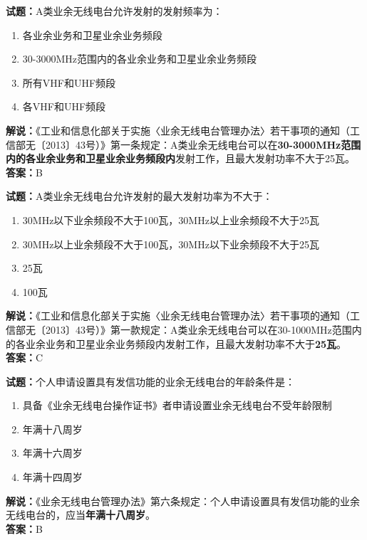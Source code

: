 \documentclass{ctexbook}
\begin{document}
\bigskip


\noindent\textbf{试题：}A类业余无线电台允许发射的发射频率为：
\begin{enumerate}[leftmargin=3em]
	\item 各业余业务和卫星业余业务频段
	\item 30-3000\si{\MHz}范围内的各业余业务和卫星业余业务频段
	\item 所有VHF和UHF频段
	\item 各VHF和UHF频段
\end{enumerate}
\noindent\textbf{解说：}《工业和信息化部关于实施〈业余无线电台管理办法〉若干事项的通知（工信部无〔2013〕43号）》第一条规定：A类业余无线电台可以在\textbf{30-3000\si{\MHz}范围内的各业余业务和卫星业余业务频段内}发射工作，且最大发射功率不大于25瓦。\\\noindent\textbf{答案：}B


\bigskip


\noindent\textbf{试题：}A类业余无线电台允许发射的最大发射功率为不大于：
\begin{enumerate}[leftmargin=3em]
	\item 30\si{\MHz}以下业余频段不大于100瓦，30\si{\MHz}以上业余频段不大于25瓦
	\item 30\si{\MHz}以上业余频段不大于100瓦，30\si{\MHz}以下业余频段不大于25瓦
	\item 25瓦
	\item 100瓦
\end{enumerate}
\noindent\textbf{解说：}《工业和信息化部关于实施〈业余无线电台管理办法〉若干事项的通知（工信部无〔2013〕43号）》第一款规定：A类业余无线电台可以在30-1000\si{\MHz}范围内的各业余业务和卫星业余业务频段内发射工作，且最大发射功率不大于\textbf{25瓦}。\\\noindent\textbf{答案：}C


\bigskip


\noindent\textbf{试题：}个人申请设置具有发信功能的业余无线电台的年龄条件是：
\begin{enumerate}[leftmargin=3em]
	\item 具备《业余无线电台操作证书》者申请设置业余无线电台不受年龄限制
	\item 年满十八周岁
	\item 年满十六周岁
	\item 年满十四周岁
\end{enumerate}
\noindent\textbf{解说：}《业余无线电台管理办法》第六条规定：个人申请设置具有发信功能的业余无线电台的，应当\textbf{年满十八周岁}。\\\noindent\textbf{答案：}B
\end{document}
